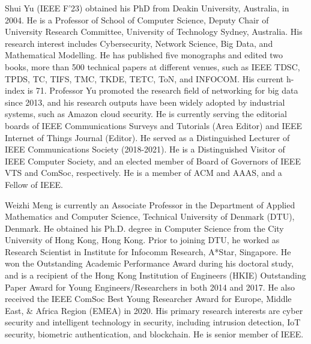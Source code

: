 \documentclass[lettersize,journal]{IEEEtran}
\begin{document}
\IEEEaftertitletext{\vspace{-2.5in}}
\begin{IEEEbiography}{Shui Yu (IEEE F’23)}
obtained his PhD from Deakin University, Australia, in 2004. He is a Professor of School of Computer Science, Deputy Chair of University Research Committee, University of Technology Sydney, Australia. His research interest includes Cybersecurity, Network Science, Big Data, and Mathematical Modelling. He has published five monographs and edited two books, more than 500 technical papers at different venues, such as IEEE TDSC, TPDS, TC, TIFS, TMC, TKDE, TETC, ToN, and INFOCOM. His current h-index is 71. Professor Yu promoted the research field of networking for big data since 2013, and his research outputs have been widely adopted by industrial systems, such as Amazon cloud security. He is currently serving the editorial boards of IEEE Communications Surveys and Tutorials (Area Editor) and IEEE Internet of Things Journal (Editor). He served as a Distinguished Lecturer of IEEE Communications Society (2018-2021). He is a Distinguished Visitor of IEEE Computer Society,  and an elected member of Board of Governors of IEEE VTS and ComSoc, respectively. He is a member of ACM and AAAS, and a Fellow of IEEE.
\end{IEEEbiography}
\IEEEaftertitletext{\vspace{-2.5in}}
\begin{IEEEbiography}{Weizhi Meng}
 is currently an Associate Professor in the Department of Applied Mathematics and Computer Science, Technical University of Denmark (DTU), Denmark. He obtained his Ph.D. degree in Computer Science from the City University of Hong Kong, Hong Kong. Prior to joining DTU, he worked as Research Scientist in Institute for Infocomm Research, A*Star, Singapore. He won the Outstanding Academic Performance Award during his doctoral study, and is a recipient of the Hong Kong Institution of Engineers (HKIE) Outstanding Paper Award for Young Engineers/Researchers in both 2014 and 2017. He also received the IEEE ComSoc Best Young Researcher Award for Europe, Middle East, \& Africa Region (EMEA) in 2020. His primary research interests are cyber security and intelligent technology in security, including intrusion detection, IoT security, biometric authentication, and blockchain. He is senior member of IEEE.
\end{IEEEbiography}
 
\end{document}
